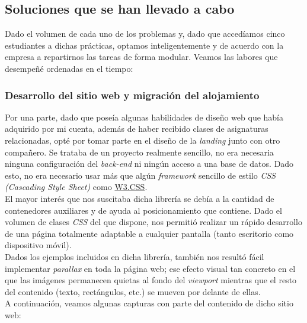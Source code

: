 \documentclass[13pt]{scrartcl}
\begin{document}
		\subsection{Soluciones que se han llevado a cabo}
			Dado el volumen de cada uno de los problemas y, dado que accedíamos cinco estudiantes a dichas prácticas, optamos inteligentemente y de acuerdo con la empresa a repartirnos las tareas de forma modular. Veamos las labores que desempeñé ordenadas en el tiempo:
			
			\subsubsection{Desarrollo del sitio web y migración del alojamiento}
				Por una parte, dado que poseía algunas habilidades de diseño web que había adquirido por mi cuenta, además de haber recibido clases de asignaturas relacionadas, opté por tomar parte en el diseño de la \textit{landing} junto con otro compañero. Se trataba de un proyecto realmente sencillo, no era necesaria ninguna configuración del \textit{back-end} ni ningún acceso a una base de datos. Dado esto, no era necesario usar más que algún \textit{framework} sencillo de estilo \textit{CSS (Cascading Style Sheet)} como \href{https://www.w3schools.com/w3css/}{W3.CSS}.\\
				
				El mayor interés que nos suscitaba dicha librería se debía a la cantidad de contenedores auxiliares y de ayuda al posicionamiento que contiene. Dado el volumen de clases \textit{CSS} del que dispone, nos permitió realizar un rápido desarrollo de una página totalmente adaptable a cualquier pantalla (tanto escritorio como dispositivo móvil).\\
				
				Dados los ejemplos incluidos en dicha librería, también nos resultó fácil implementar \textit{parallax} en toda la página web; ese efecto visual tan concreto en el que las imágenes permanecen quietas al fondo del \textit{viewport} mientras que el resto del contenido (texto, rectángulos, etc.) se mueven por delante de ellas.\\
				
				A continuación, veamos algunas capturas con parte del contenido de dicho sitio web:
				
\end{document}
